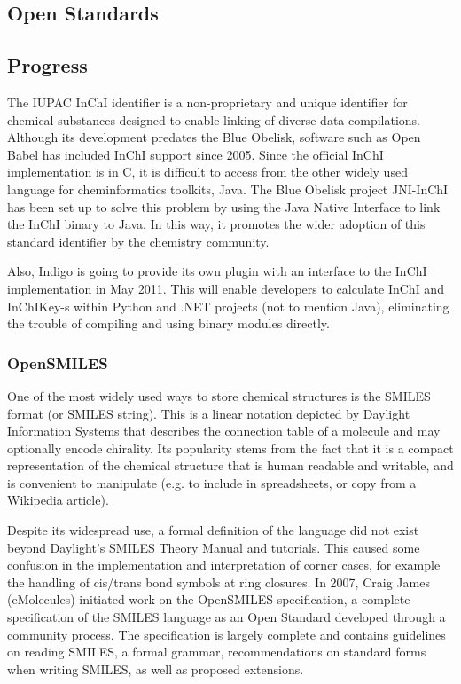 \documentclass[10pt]{bmc_article}
\newenvironment{bmcformat}{\begin{raggedright}\baselineskip20pt\sloppy\setboolean{publ}{false}}{\end{raggedright}\baselineskip20pt\sloppy}
\begin{document}
\begin{bmcformat}
\section*{Open Standards}
  \subsection*{Progress}

The IUPAC InChI identifier is a non-proprietary and unique identifier
for chemical substances designed to enable linking of diverse data
compilations. Although its development predates the Blue Obelisk,
software such as Open Babel has included InChI support since 2005.
Since the official InChI implementation is in C, it is difficult to
access from the other widely used language for cheminformatics
toolkits, Java. The Blue Obelisk project JNI-InChI has been set up to
solve this problem by using the Java Native Interface to link the
InChI binary to Java. In this way, it promotes the wider adoption of
this standard identifier by the chemistry community.

Also, Indigo is going to provide its own plugin with an interface to
the InChI implementation in May 2011. This will enable developers to
calculate InChI and InChIKey-s within Python and .NET projects (not to
mention Java), eliminating the trouble of compiling and using binary
modules directly.

    \subsubsection*{OpenSMILES}

One of the most widely used ways to store chemical structures is the
SMILES format (or SMILES string). This is a linear notation depicted
by Daylight Information Systems that describes the connection table
of a molecule and may optionally encode chirality. Its popularity
stems from the fact that it is a compact representation of the
chemical structure that is human readable and writable, and is
convenient to manipulate (e.g. to include in spreadsheets, or copy
from a Wikipedia article).

Despite its widespread use, a formal
definition of the language did not exist beyond Daylight's SMILES
Theory Manual and tutorials. This caused some confusion in the
implementation and interpretation of corner cases, for example the
handling of cis/trans bond symbols at ring closures. In 2007, Craig
James (eMolecules) initiated work on the OpenSMILES specification, a
complete specification of the SMILES language as an Open Standard
developed through a community process. The specification is largely
complete and contains guidelines on reading SMILES, a formal
grammar, recommendations on standard forms when writing SMILES, as
well as proposed extensions.


\end{bmcformat}
\end{document}
